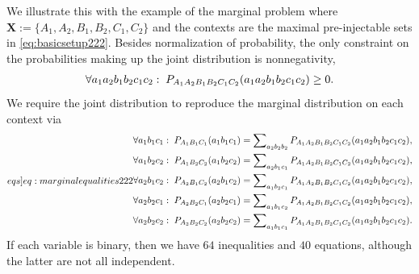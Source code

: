 { We illustrate this with the example of the marginal problem where $\bm{X} := \{ A_1, A_2, B_1, B_2, C_1, C_2\}$ and the contexts are the 
maximal pre-injectable sets in \cref{eq:basicsetup222}.
Besides normalization of probability, the only constraint on the probabilities making up the joint distribution is nonnegativity,
\begin{align}\label{eq:nonnegativity}
\forall{a_1 a_2 b_1 b_2 c_1 c_2}:\; \pdf[A_1 A_2 B_1 B_2 C_1 C_2]{a_1 a_2 b_1 b_2 c_1 c_2} \geq 0.
\end{align}
We require the joint distribution to reproduce the marginal distribution on each context via
\begin{align}\label[eqs]{eq:marginalequalities222}
\begin{split}
&\forall{a_1 b_1 c_1}:\;\pdf[A_1 B_1 C_1]{a_1 b_1 c_1} = \sum\nolimits_{a_2 b_2 b_2}\pdf[A_1 A_2 B_1 B_2 C_1 C_2]{a_1 a_2 b_1 b_2 c_1 c_2},\\
&\forall{a_1 b_2 c_2}:\;\pdf[A_1 B_2 C_2]{a_1 b_2 c_2} = \sum\nolimits_{a_2 b_1 c_1}\pdf[A_1 A_2 B_1 B_2 C_1 C_2]{a_1 a_2 b_1 b_2 c_1 c_2},\\
&\forall{a_2 b_1 c_2}:\;\pdf[A_2 B_1 C_2]{a_2 b_1 c_2} = \sum\nolimits_{a_1 b_2 c_1}\pdf[A_1 A_2 B_1 B_2 C_1 C_2]{a_1 a_2 b_1 b_2 c_1 c_2},\\
&\forall{a_2 b_2 c_1}:\;\pdf[A_2 B_2 C_1]{a_2 b_2 c_1} = \sum\nolimits_{a_1 b_1 c_2}\pdf[A_1 A_2 B_1 B_2 C_1 C_2]{a_1 a_2 b_1 b_2 c_1 c_2},\\
&\forall{a_2 b_2 c_2}:\;\pdf[A_2 B_2 C_2]{a_2 b_2 c_2} = \sum\nolimits_{a_1 b_1 c_1}\pdf[A_1 A_2 B_1 B_2 C_1 C_2]{a_1 a_2 b_1 b_2 c_1 c_2}.
\end{split}
\end{align}
If each variable is binary, then we have $64$ inequalities and $40$ equations, although the latter are not all independent. 

}
